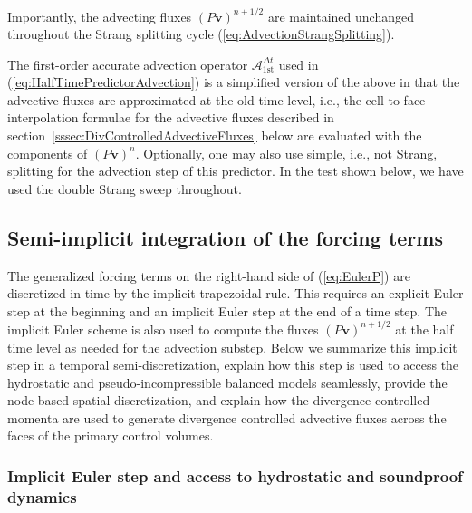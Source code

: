 \documentclass[12pt,a4paper]{article}
\theoremstyle{definition}
\newcommand{\eq}[1]{(\ref{#1})}
\newcommand{\vect}[1]{{\mathbf{#1}}}
\newcommand{\vv}{\vect{v}}
\newcommand{\half}{1/2}
\newcommand{\dt}{\Delta t}
\begin{document}
Importantly, the advecting fluxes $(P\vv)^{n+\half}$ are maintained unchanged 
throughout the Strang splitting cycle \eq{eq:AdvectionStrangSplitting}.

The first-order accurate advection operator $\mathcal{A}_{1\text{st}}^{\dt}$
used in \eq{eq:HalfTimePredictorAdvection} is a simplified version
of the above in that the advective fluxes are approximated at the old time level,
i.e., the cell-to-face interpolation formulae for the advective fluxes described
in section~\ref{sssec:DivControlledAdvectiveFluxes} below are evaluated with the
components of $(P\vv)^n$. Optionally, one may also use simple, i.e., not Strang, 
splitting for the advection step of this predictor. In the test shown below, 
we have used the double Strang sweep throughout.


\subsection{Semi-implicit integration of the forcing terms}
\label{ssec:SemiImplicitForcing}

The generalized forcing terms on the right-hand side of \eq{eq:EulerP} are 
discretized in time by the implicit trapezoidal rule. This requires an explicit 
Euler step at the beginning and an implicit Euler step at the end of a time step. 
The implicit Euler scheme is also used to compute the fluxes $(P\vv)^{n+\half}$ 
at the half time level as needed for the advection substep. Below we summarize this 
implicit step in a temporal semi-discretization, explain how this step is used
to access the hydrostatic and pseudo-incompressible balanced models seamlessly, 
provide the node-based spatial discretization, and explain how the 
divergence-controlled momenta are used to generate divergence controlled advective 
fluxes across the faces of the primary control volumes.


\subsubsection{Implicit Euler step and access to hydrostatic and soundproof dynamics}
\label{sssec:ImplicitEuler}
\end{document}
